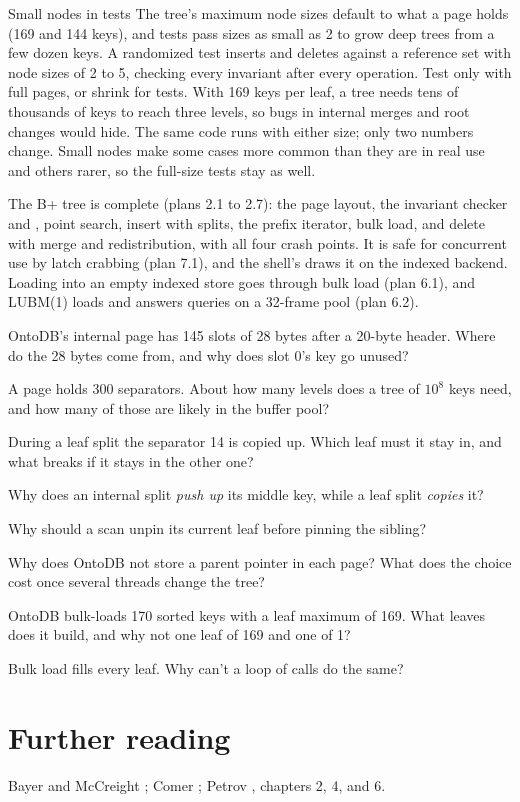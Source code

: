 \begin{decision}{Small nodes in tests}
 The tree's maximum node sizes default to what a page holds
(169 and 144 keys), and tests pass sizes as small as 2 to grow deep trees from
a few dozen keys. A randomized test inserts and deletes against a reference set
with node sizes of 2 to 5, checking every invariant after every operation.
 Test only with full pages, or shrink  for
tests.
 With 169 keys per leaf, a tree needs tens of thousands of keys to
reach three levels, so bugs in internal merges and root changes would hide. The
same code runs with either size; only two numbers change.
 Small nodes make some cases more common than they are in real use
and others rarer, so the full-size tests stay as well.
\end{decision}

\begin{status}
The B+ tree is complete (plans 2.1 to 2.7): the page layout, the invariant
checker and , point search, insert with splits, the prefix
iterator, bulk load, and delete with merge and redistribution, with all four
crash points. It is safe for concurrent use by latch crabbing (plan 7.1), and
the shell's  draws it on the indexed backend. Loading into
an empty indexed store goes through bulk load (plan 6.1), and LUBM(1) loads and
answers queries on a 32-frame pool (plan 6.2).
\end{status}

\begin{checkyourself}
\item OntoDB's internal page has 145 slots of 28 bytes after a 20-byte header. Where do the 28 bytes come from, and why does slot 0's key go unused?
\item A page holds 300 separators. About how many levels does a tree of $10^8$ keys need, and how many of those are likely in the buffer pool?
\item During a leaf split the separator 14 is copied up. Which leaf must it stay in, and what breaks if it stays in the other one?
\item Why does an internal split \emph{push up} its middle key, while a leaf split \emph{copies} it?
\item Why should a scan unpin its current leaf before pinning the sibling?
\item Why does OntoDB not store a parent pointer in each page? What does the choice cost once several threads change the tree?
\item OntoDB bulk-loads 170 sorted keys with a leaf maximum of 169. What leaves does it build, and why not one leaf of 169 and one of 1?
\item Bulk load fills every leaf. Why can't a loop of  calls do the same?
\end{checkyourself}

\section*{Further reading}
Bayer and McCreight \cite{bayer1972}; Comer \cite{comer1979}; Petrov
\cite{petrov}, chapters 2, 4, and 6.
